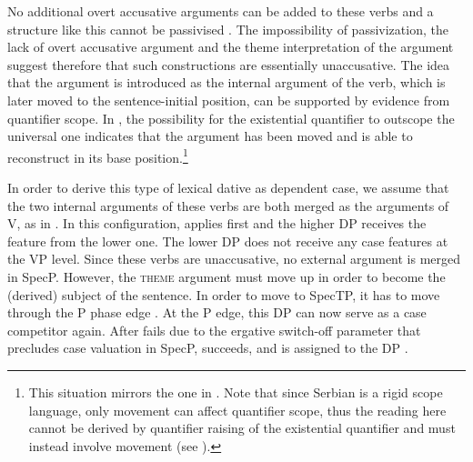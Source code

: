 \documentclass[output=paper,
modfonts,
newtxmath,
hidelinks
]{langscibook}
\begin{document}
\noindent No additional overt accusative arguments can be added to these verbs and a structure like this cannot be passivised . The impossibility of passivization, the lack of overt accusative argument and the theme interpretation of the \nomm{} argument suggest therefore that such constructions are essentially unaccusative. The idea that the \nomm{} argument is introduced as the internal argument of the verb, which is later moved to the sentence-initial position, can be supported by evidence from quantifier scope. In , the possibility for the existential quantifier to outscope the universal one indicates that the  \nomm{} argument has been moved and is able to reconstruct in its base position.\footnote{This situation mirrors the one in . Note that since Serbian is a rigid scope language, only movement can affect quantifier scope, thus the reading here cannot be derived by quantifier raising of the existential quantifier and must instead involve movement (see \citealt{antonyk15}).}

\label{ex34}
\z

\label{ex35}
\z

\noindent In order to derive this type of lexical dative as dependent case, we assume that the two internal arguments of these verbs are both merged as the arguments of V, as in . In this configuration, \down{} applies first and the higher DP receives the \lr{} feature from the lower one. The lower DP does not receive any case features at the VP level. Since these verbs are unaccusative, no external argument is merged in Spec\littlev{}P. However, the \textsc{theme} argument must move up in order to become the (derived) subject of the sentence. In order to move to SpecTP, it has to move through the \littlev{}P phase edge \citep{legate03}. At the \littlev{}P edge, this DP can now serve as a case competitor again. After \down{} fails due to the ergative switch-off parameter that precludes case valuation in Spec\littlev{}P, \up{} succeeds, and \hr{} is assigned to the \datt{} DP .
	
\end{document}

